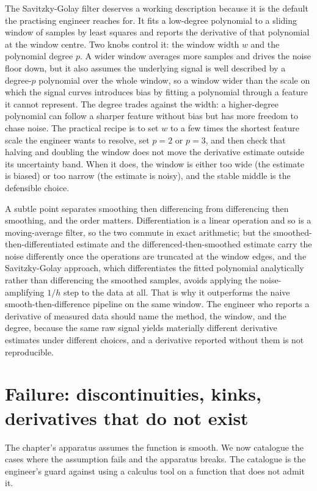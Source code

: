 The Savitzky-Golay filter deserves a working description because it
is the default the practising engineer reaches for. It fits a
low-degree polynomial to a sliding window of samples by least squares
and reports the derivative of that polynomial at the window centre.
Two knobs control it: the window width $w$ and the polynomial degree
$p$. A wider window averages more samples and drives the noise floor
down, but it also assumes the underlying signal is well described by a
degree-$p$ polynomial over the whole window, so a window wider than
the scale on which the signal curves introduces bias by fitting a
polynomial through a feature it cannot represent. The degree trades
against the width: a higher-degree polynomial can follow a sharper
feature without bias but has more freedom to chase noise. The
practical recipe is to set $w$ to a few times the shortest feature
scale the engineer wants to resolve, set $p = 2$ or $p = 3$, and then
check that halving and doubling the window does not move the derivative
estimate outside its uncertainty band. When it does, the window is
either too wide (the estimate is biased) or too narrow (the estimate
is noisy), and the stable middle is the defensible choice.

A subtle point separates smoothing then differencing from
differencing then smoothing, and the order matters. Differentiation
is a linear operation and so is a moving-average filter, so the two
commute in exact arithmetic; but the smoothed-then-differentiated
estimate and the differenced-then-smoothed estimate carry the noise
differently once the operations are truncated at the window edges, and
the Savitzky-Golay approach, which differentiates the fitted
polynomial analytically rather than differencing the smoothed samples,
avoids applying the noise-amplifying $1/h$ step to the data at all.
That is why it outperforms the naive smooth-then-difference pipeline on
the same window. The engineer who reports a derivative of measured
data should name the method, the window, and the degree, because the
same raw signal yields materially different derivative estimates under
different choices, and a derivative reported without them is not
reproducible.

\section{Failure: discontinuities, kinks, derivatives that do not exist}

The chapter's apparatus assumes the function is smooth. We now
catalogue the cases where the assumption fails and the apparatus
breaks. The catalogue is the engineer's guard against using a
calculus tool on a function that does not admit it.

